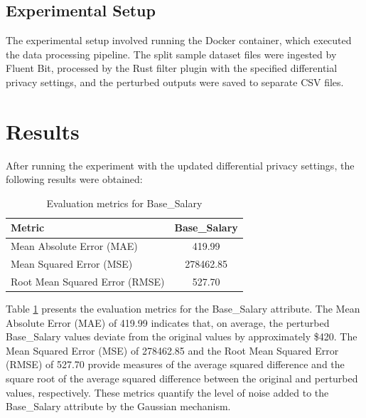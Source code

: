 \subsection{Experimental Setup}
The experimental setup involved running the Docker container, which executed the data processing pipeline. The split sample dataset files were ingested by Fluent Bit, processed by the Rust filter plugin with the specified differential privacy settings, and the perturbed outputs were saved to separate CSV files.
\section{Results}
After running the experiment with the updated differential privacy settings, the following results were obtained:
\begin{table}[H]
\centering
\begin{tabular}{l|c}
\hline
\textbf{Metric} & \textbf{Base\_Salary} \\
\hline
Mean Absolute Error (MAE) & 419.99 \\
Mean Squared Error (MSE) & 278462.85 \\
Root Mean Squared Error (RMSE) & 527.70 \\
\hline
\end{tabular}
\caption{Evaluation metrics for Base\_Salary}
\label{tab:base_salary_metrics}
\end{table}
Table \ref{tab:base_salary_metrics} presents the evaluation metrics for the Base\_Salary attribute. The Mean Absolute Error (MAE) of 419.99 indicates that, on average, the perturbed Base\_Salary values deviate from the original values by approximately \$420. The Mean Squared Error (MSE) of 278462.85 and the Root Mean Squared Error (RMSE) of 527.70 provide measures of the average squared difference and the square root of the average squared difference between the original and perturbed values, respectively. These metrics quantify the level of noise added to the Base\_Salary attribute by the Gaussian mechanism.

